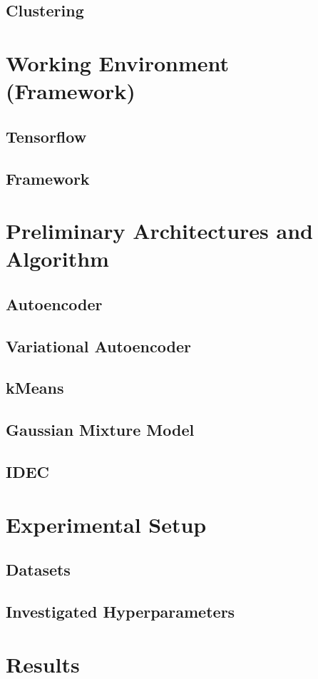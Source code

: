 \documentclass[12pt,DIV14,BCOR12mm,a4paper,footexclude,headinclude,halfparskip-,twoside,openright,openany,cleardoubleempty,idxtotoc,bibtotoc]{scrreprt} %
\numberwithin{equation}{chapter}
\begin{document}
\section{Clustering}
\chapter{Working Environment (Framework)}
\section{Tensorflow}
\section{Framework}
\chapter{Preliminary Architectures and Algorithm}
\section{Autoencoder}
\section{Variational Autoencoder}
\section{kMeans}
\section{Gaussian Mixture Model}
\section{IDEC}
\chapter{Experimental Setup}
\section{Datasets}
\section{Investigated Hyperparameters}
\chapter{Results}
\end{document}

